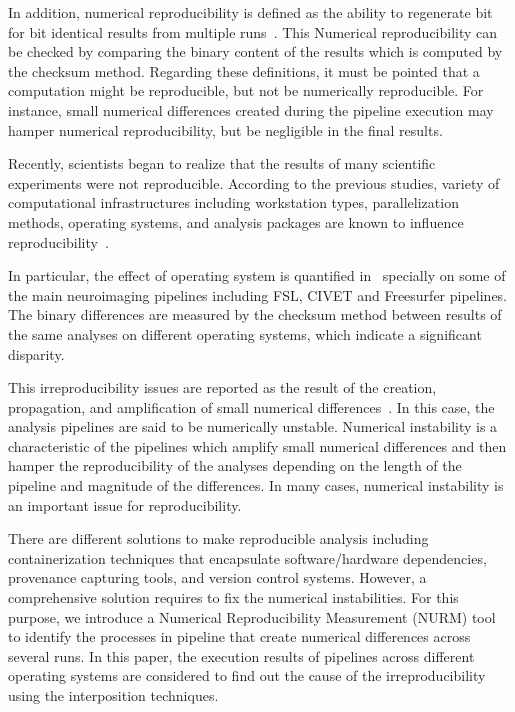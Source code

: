 \documentclass[a4paper,num-refs]{oup-contemporary}
\begin{document}
In addition, numerical reproducibility is defined as the ability to 
regenerate bit for bit identical results from multiple 
runs~\cite{hill2017numerical}. This Numerical reproducibility can be 
checked by comparing the binary content of the results which is 
computed by the checksum method.
Regarding these definitions, it must be pointed that a
computation might be reproducible, but not 
be numerically reproducible. For instance, small numerical differences 
created during the pipeline execution may hamper numerical 
reproducibility, but be negligible in the final results.

Recently, scientists began to realize that the results of many 
scientific experiments were not reproducible. According to the previous 
studies, variety of computational infrastructures including workstation 
types, parallelization methods, operating systems, and analysis 
packages are known to influence reproducibility~\cite{Gronenschild2012, 
diethelm2012limits, Glatard2015, bowring2019exploring}.

In particular, the effect of operating system is quantified 
in~\cite{Glatard2015, Gronenschild2012} specially on some of the main 
neuroimaging pipelines including FSL, CIVET and Freesurfer pipelines. 
The binary differences are measured by the checksum method between 
results of the same analyses on different operating systems, which 
indicate a significant disparity. 

This irreproducibility issues are reported as the result of the 
creation, propagation, and amplification of small numerical 
differences~\cite{Gronenschild2012, diethelm2012limits, Glatard2015, 
bowring2019exploring}. In this case, the analysis pipelines are said to 
be numerically unstable. Numerical instability is a characteristic of 
the pipelines which amplify small numerical differences and then hamper 
the reproducibility of the analyses depending on the length of the 
pipeline and magnitude of the differences. In many cases, numerical 
instability is an important issue for reproducibility.

There are different solutions to make reproducible analysis including 
containerization techniques that encapsulate software/hardware 
dependencies, provenance capturing tools, and version control systems. 
However, a comprehensive solution requires to fix the numerical 
instabilities. For this purpose, we introduce a Numerical 
Reproducibility Measurement (NURM) tool to identify the processes in 
pipeline that create numerical differences across several runs. In this 
paper, the execution results of pipelines across different operating 
systems are considered to find out the cause of the irreproducibility 
using the interposition techniques.
\end{document}
